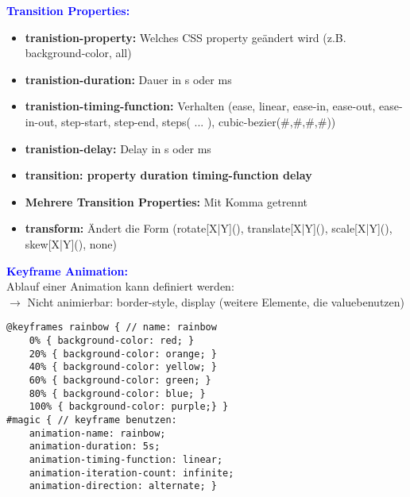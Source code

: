 \textbf{\textcolor{blue}{Transition Properties:}}
\begin{itemize}[topsep=0pt, leftmargin=3mm]
    \setlength\itemsep{-0.3em}
    \item \textbf{tranistion-property:} Welches CSS property geändert wird (z.B. background-color, all)
    \item \textbf{tranistion-duration:} Dauer in s oder ms
    \item \textbf{tranistion-timing-function:} Verhalten (ease, linear, ease-in, ease-out, ease-in-out, step-start, step-end, steps( ... ), cubic-bezier(\#,\#,\#,\#))
    \item \textbf{tranistion-delay:} Delay in s oder ms
    \item \textbf{transition: property duration timing-function delay}
    \item \textbf{Mehrere Transition Properties:} Mit Komma getrennt
    \item \textbf{transform:} Ändert die Form (rotate[X|Y](), translate[X|Y](), scale[X|Y](), skew[X|Y](), none)
\end{itemize}
\textbf{\textcolor{blue}{Keyframe Animation:}}\\
Ablauf einer Animation kann definiert werden:\\
$\rightarrow$ Nicht animierbar: border-style, display (weitere Elemente, die \dq value\dq benutzen)
\begin{lstlisting}[style=htmlcssjs]
@keyframes rainbow { // name: rainbow
    0% { background-color: red; }
    20% { background-color: orange; }
    40% { background-color: yellow; }
    60% { background-color: green; }
    80% { background-color: blue; }
    100% { background-color: purple;} }
#magic { // keyframe benutzen:
    animation-name: rainbow;
    animation-duration: 5s;
    animation-timing-function: linear;
    animation-iteration-count: infinite;
    animation-direction: alternate; }
\end{lstlisting}
